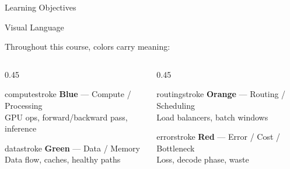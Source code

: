 \documentclass[aspectratio=169, 12pt]{beamer}
\begin{document}
\begin{frame}{Learning Objectives}
\end{frame}

\begin{frame}{Visual Language}

\small
Throughout this course, colors carry meaning:

\vspace{0.3cm}
\begin{columns}[T]
  \begin{column}{0.45\textwidth}
    \begin{mlsyscard}{computestroke}
    \textbf{Blue} --- Compute / Processing\\
    {\footnotesize GPU ops, forward/backward pass, inference}
    \end{mlsyscard}
    \vspace{0.15cm}
    \begin{mlsyscard}{datastroke}
    \textbf{Green} --- Data / Memory\\
    {\footnotesize Data flow, caches, healthy paths}
    \end{mlsyscard}
  \end{column}
  \begin{column}{0.45\textwidth}
    \begin{mlsyscard}{routingstroke}
    \textbf{Orange} --- Routing / Scheduling\\
    {\footnotesize Load balancers, batch windows}
    \end{mlsyscard}
    \vspace{0.15cm}
    \begin{mlsyscard}{errorstroke}
    \textbf{Red} --- Error / Cost / Bottleneck\\
    {\footnotesize Loss, decode phase, waste}
    \end{mlsyscard}
  \end{column}
\end{columns}
\end{frame}
\end{document}
